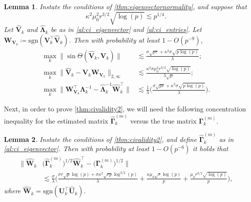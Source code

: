 \documentclass[10pt]{article}
\newcommand{\0}{{\mathbf{0}}}
\newcommand{\1}{{\mathbf{1}}}
\newcommand{\U}{{\mathbf{U}}}
\renewcommand{\t}{^{\top}}
\newcommand{\uhat}{\mathbf{\hat{U}}}
\newtheorem{lemma}{Lemma}
\newcommand{\inv}{^{-1}}
\renewcommand{\hat}{\widehat}
\renewcommand{\hat}{\widehat}
\begin{document}
\begin{lemma} \label{lem:Vmatrixcloseness} Instate the conditions of \cref{thm:eigenvectornormality}, and suppose that $$\kappa^2 \mu_0^2 r^{3/2} \sqrt{\log(p)} \lesssim p^{1/4}.$$
Let $\mathbf{\hat V}_k$ and $\mathbf{\hat \Lambda}_k$ be as in \cref{al:ci_eigenvector} and \cref{al:ci_entries}.  Let $\mathbf{W}_{\mathbf{V}_k} \coloneqq \mathrm{sgn}(\mathbf{ V}_k\t \mathbf{\hat V}_k)$.  Then with probability at least $1 - O(p^{-9})$,
\begin{align*}
\max_k \| \sin\Theta(\mathbf{\hat V}_k,\mathbf{V}_k) \| &\lesssim \frac{\sigma \sqrt{pr} + \kappa^2 \sigma \sqrt{p\log(p)}}{\lambda}; \\
\max_k   \| \mathbf{\hat V}_k - \mathbf{V}_k \mathbf{W}_{\mathbf{V}_k} \|_{2,\infty} &\lesssim \frac{\kappa^2 \sigma \mu_0^2 r^{3/2} \sqrt{\log(p)}}{\lambda \sqrt{p}}; \\
\max_k  \| \mathbf{W}_{\mathbf{V}_k}\t \mathbf{\Lambda}_k\inv - \mathbf{\hat{\Lambda}}_k\inv \mathbf{\hat W}_k\t \| &\lesssim \frac{1}{\lambda} \bigg( \frac{\sigma \sqrt{pr} + \kappa^2 \sigma \sqrt{p\log(p)}}{\lambda} \bigg).
\end{align*}
\end{lemma}
\noindent 
Next, in order to prove \cref{thm:civalidity2}, we will need the following concentration inequality for the estimated matrix $\mathbf{\hat \Gamma}^{(m)}_k$ versus the true matrix $\mathbf{\Gamma}^{(m)}_k$.  
\begin{lemma}\label{lem:gammacloseness}
Instate the conditions of \cref{thm:civalidity2}, and define $\mathbf{\hat \Gamma}^{(m)}_k$ as in \cref{al:ci_eigenvector}.  Then with probability at least $1 - O(p^{-6})$ it holds that
\begin{align*}
 \| \mathbf{\hat W}_k&\big(\mathbf{\hat \Gamma}^{(m)}_k \big)^{1/2}\mathbf{\hat W}_k\t -\big(\mathbf{\Gamma}^{(m)}_k \big)^{1/2} \| \\
 &\lesssim \frac{\sigma}{\lambda} \bigg( \frac{\sigma r \sqrt{p}\log(p) + \sigma \kappa^2 \sqrt{rp} \log^{3/2}(p)}{\lambda} + \frac{\kappa \mu_0 \sqrt{r} \log(p)}{p} + \frac{\mu_0 r^{3/2} \sqrt{\log(p)}}{p} \bigg),
 \end{align*}
 where $\mathbf{\hat W}_k = \mathrm{sgn}(\U_k\t \uhat_k)$.
\end{lemma}
\end{document}

